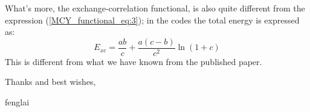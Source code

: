 What's more, the exchange-correlation functional, is also quite different from
the expression (\ref{MCY_functional_eq:3}); in the codes the total energy is
expressed as:
\begin{equation}
 E_{xc} = \frac{ab}{c} + \frac{a(c-b)}{c^{2}}\ln(1+c) 
\end{equation}
This is different from what we have known from the published paper.

Thanks and best wishes,

fenglai  
 
 







